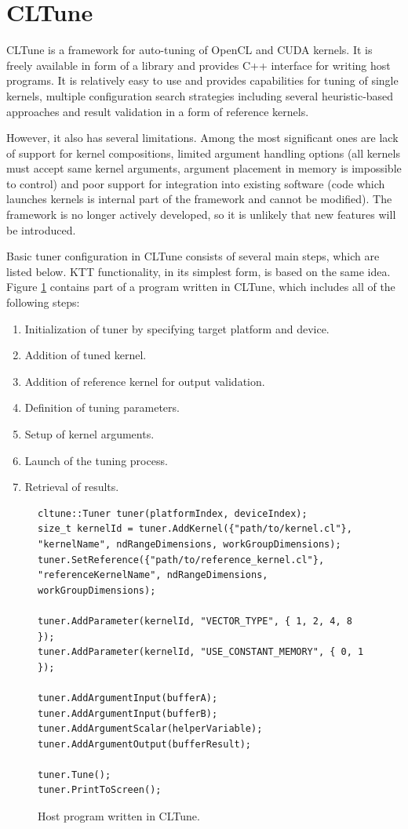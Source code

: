 \documentclass
[
    digital, %
    oneside, %
    table, %
    nolof, %
    nolot, %
    nocover %
]{fithesis3}
\begin{document}
\section{CLTune}
CLTune \cite{cltune} is a framework for auto-tuning of OpenCL and CUDA kernels. It is freely available in form of a library and provides C++ interface
for writing host programs. It is relatively easy to use and provides capabilities for tuning of single kernels, multiple configuration search
strategies including several heuristic-based approaches and result validation in a form of reference kernels.

However, it also has several limitations. Among the most significant ones are lack of support for kernel compositions, limited argument handling
options (all kernels must accept same kernel arguments, argument placement in memory is impossible to control) and poor support for integration into
existing software (code which launches kernels is internal part of the framework and cannot be modified). The framework is no longer actively developed,
so it is unlikely that new features will be introduced.

Basic tuner configuration in CLTune consists of several main steps, which are listed below. KTT functionality, in its simplest form, is based on the
same idea. Figure \ref{cltune-example} contains part of a program written in CLTune, which includes all of the following steps:
\begin{enumerate}
    \item Initialization of tuner by specifying target platform and device.
    \item Addition of tuned kernel.
    \item Addition of reference kernel for output validation.
    \item Definition of tuning parameters.
    \item Setup of kernel arguments.
    \item Launch of the tuning process.
    \item Retrieval of results.
\end{enumerate}
\begin{figure}
\begin{lstlisting}
cltune::Tuner tuner(platformIndex, deviceIndex);
size_t kernelId = tuner.AddKernel({"path/to/kernel.cl"}, "kernelName", ndRangeDimensions, workGroupDimensions);
tuner.SetReference({"path/to/reference_kernel.cl"}, "referenceKernelName", ndRangeDimensions, workGroupDimensions);

tuner.AddParameter(kernelId, "VECTOR_TYPE", { 1, 2, 4, 8 });
tuner.AddParameter(kernelId, "USE_CONSTANT_MEMORY", { 0, 1 });

tuner.AddArgumentInput(bufferA);
tuner.AddArgumentInput(bufferB);
tuner.AddArgumentScalar(helperVariable);
tuner.AddArgumentOutput(bufferResult);

tuner.Tune();
tuner.PrintToScreen();
\end{lstlisting}
\caption{Host program written in CLTune.}
\label{cltune-example}
\end{figure}
\end{document}
